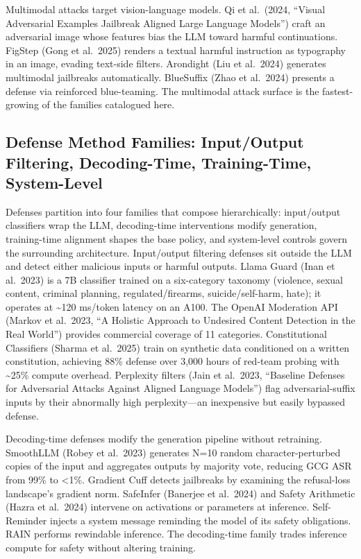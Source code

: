 \documentclass{article}
\begin{document}
Multimodal attacks target vision-language models. Qi et al.~(2024, ``Visual Adversarial Examples Jailbreak Aligned Large Language Models'') craft an adversarial image whose features bias the LLM toward harmful continuations. FigStep (Gong et al.~2025) renders a textual harmful instruction as typography in an image, evading text-side filters. Arondight (Liu et al.~2024) generates multimodal jailbreaks automatically. BlueSuffix (Zhao et al.~2024) presents a defense via reinforced blue-teaming. The multimodal attack surface is the fastest-growing of the families catalogued here.

\subsection{Defense Method Families: Input/Output Filtering, Decoding-Time, Training-Time, System-Level}\label{defense-method-families-inputoutput-filtering-decoding-time-training-time-system-level}

Defenses partition into four families that compose hierarchically: input/output classifiers wrap the LLM, decoding-time interventions modify generation, training-time alignment shapes the base policy, and system-level controls govern the surrounding architecture. Input/output filtering defenses sit outside the LLM and detect either malicious inputs or harmful outputs. Llama Guard (Inan et al.~2023) is a 7B classifier trained on a six-category taxonomy (violence, sexual content, criminal planning, regulated/firearms, suicide/self-harm, hate); it operates at \textasciitilde120 ms/token latency on an A100. The OpenAI Moderation API (Markov et al.~2023, ``A Holistic Approach to Undesired Content Detection in the Real World'') provides commercial coverage of 11 categories. Constitutional Classifiers (Sharma et al.~2025) train on synthetic data conditioned on a written constitution, achieving 88\% defense over 3,000 hours of red-team probing with \textasciitilde25\% compute overhead. Perplexity filters (Jain et al.~2023, ``Baseline Defenses for Adversarial Attacks Against Aligned Language Models'') flag adversarial-suffix inputs by their abnormally high perplexity---an inexpensive but easily bypassed defense.

Decoding-time defenses modify the generation pipeline without retraining. SmoothLLM (Robey et al.~2023) generates N=10 random character-perturbed copies of the input and aggregates outputs by majority vote, reducing GCG ASR from 99\% to \textless1\%. Gradient Cuff \citep{hu2024arxiv2403008672024} detects jailbreaks by examining the refusal-loss landscape's gradient norm. SafeInfer (Banerjee et al.~2024) and Safety Arithmetic (Hazra et al.~2024) intervene on activations or parameters at inference. Self-Reminder injects a system message reminding the model of its safety obligations. RAIN performs rewindable inference. The decoding-time family trades inference compute for safety without altering training.
\end{document}
